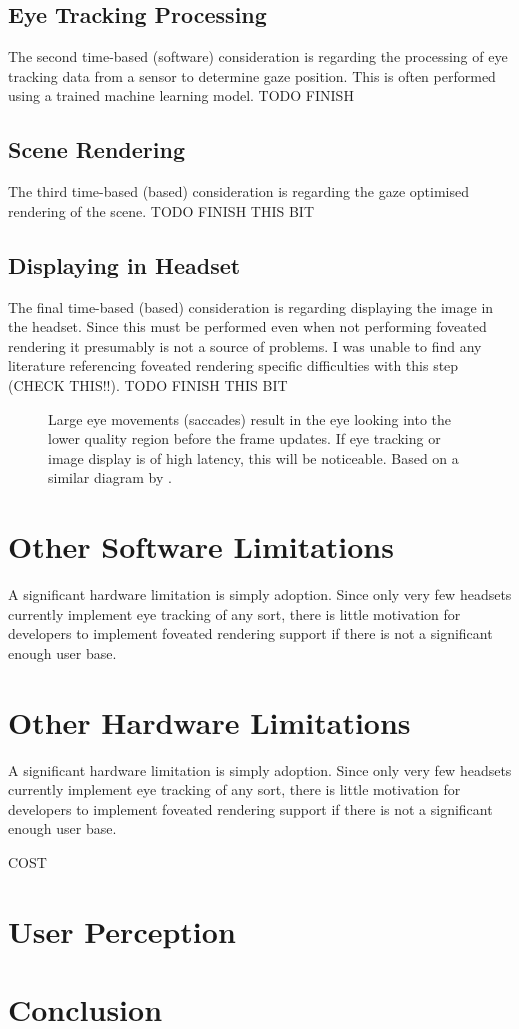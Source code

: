 \documentclass[a4paper,11pt]{article}
\begin{document}
\subsection{Eye Tracking Processing}
The second time-based (software) consideration is regarding the processing of eye tracking data from a sensor to determine gaze position. This is often performed using a trained machine learning model. TODO FINISH

\subsection{Scene Rendering}
The third time-based (based) consideration is regarding the gaze optimised rendering of the scene. TODO FINISH THIS BIT

\subsection{Displaying in Headset}
The final time-based (based) consideration is regarding displaying the image in the headset. Since this must be performed even when not performing foveated rendering it presumably is not a source of problems. I was unable to find any literature referencing foveated rendering specific difficulties with this step (CHECK THIS!!). TODO FINISH THIS BIT

\begin{figure}
  \begin{center}
    
    \caption{Large eye movements (saccades) result in the eye looking into the lower quality region before the frame updates. If eye tracking or image display is of high latency, this will be noticeable. Based on a similar diagram by \textcite{albert2017latency}.}
    \label{fig:eye}
  \end{center}
\end{figure}

\section{Other Software Limitations}
A significant hardware limitation is simply adoption. Since only very few headsets currently implement eye tracking of any sort, there is little motivation for developers to implement foveated rendering support if there is not a significant enough user base.

\section{Other Hardware Limitations}
A significant hardware limitation is simply adoption. Since only very few headsets currently implement eye tracking of any sort, there is little motivation for developers to implement foveated rendering support if there is not a significant enough user base.

COST

\section{User Perception}

\section{Conclusion}

\printbibliography
\end{document}
